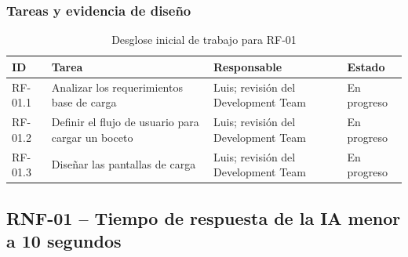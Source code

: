 \documentclass[12pt,a4paper]{article}
\begin{document}
\subsubsection*{Tareas y evidencia de diseño}

\begin{table}[htbp]
    \centering
    \caption{Desglose inicial de trabajo para RF-01}
    \label{tab:tareas-rf01}
    \begin{tabularx}{\textwidth}{L{1.7cm}Y L{2.7cm} L{1.7cm}}
        \toprule
        \textbf{ID} & \textbf{Tarea} & \textbf{Responsable} & \textbf{Estado} \\
        \midrule
        RF-01.1 & Analizar los requerimientos base de carga & Luis; revisión del Development Team & En progreso \\
        RF-01.2 & Definir el flujo de usuario para cargar un boceto & Luis; revisión del Development Team & En progreso \\
        RF-01.3 & Diseñar las pantallas de carga & Luis; revisión del Development Team & En progreso \\
        \bottomrule
    \end{tabularx}
\end{table}

\subsection{RNF-01 -- Tiempo de respuesta de la IA menor a 10 segundos}
\end{document}
